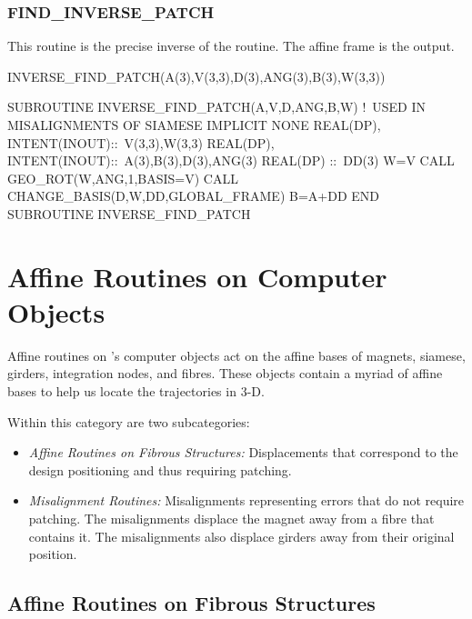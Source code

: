 \subsubsection{FIND_INVERSE_PATCH}

%
This routine is the precise inverse of the  routine.
The affine frame  is the output.

\begin{ptccode}
INVERSE_FIND_PATCH(A(3),V(3,3),D(3),ANG(3),B(3),W(3,3))
\end{ptccode}

\begin{ptccode}
SUBROUTINE INVERSE_FIND_PATCH(A,V,D,ANG,B,W)
  !\ USED IN MISALIGNMENTS OF SIAMESE
  IMPLICIT NONE
  REAL(DP), INTENT(INOUT)::\ V(3,3),W(3,3)
  REAL(DP), INTENT(INOUT)::\ A(3),B(3),D(3),ANG(3)
  REAL(DP) ::\  DD(3)
  W=V
  CALL GEO_ROT(W,ANG,1,BASIS=V)
  CALL CHANGE_BASIS(D,W,DD,GLOBAL_FRAME)
  B=A+DD
END SUBROUTINE INVERSE_FIND_PATCH
\end{ptccode}


\section{Affine Routines on Computer Objects}

%
Affine routines on \PTC's computer objects act on the affine bases of magnets,
siamese, girders, integration nodes, and fibres. These objects contain
a myriad of affine bases to help us locate the trajectories in 3-D.

Within this category are two subcategories:
\begin{itemize}
  \item \emph{Affine Routines on Fibrous Structures:} Displacements
that correspond to the design positioning and thus requiring patching.
  \item \emph{Misalignment Routines:} Misalignments representing errors
that do not require patching. The misalignments displace the magnet away
from a fibre that contains it. The misalignments also displace girders
away from their original position.
\end{itemize}


\subsection{Affine Routines on Fibrous Structures}

